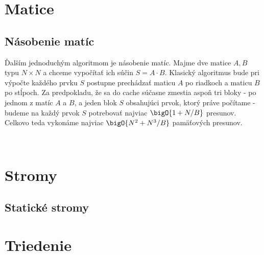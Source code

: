 \section{Matice}

\subsection{Násobenie matíc}

Ďalším jednoduchým \obliv algoritmom je násobenie matíc. Majme dve matice $A, B$ typu $N \times N$ a chceme vypočítať ich súčin $S = A \cdot B$. Klasický algoritmus bude pri výpočte každého prvku $S$ postupne prechádzať maticu $A$ po riadkoch a maticu $B$ po stĺpoch. Za predpokladu, že sa do cache súčasne zmestia aspoň tri bloky - po jednom z matíc $A$ a $B$, a jeden blok $S$ obsahujúci prvok, ktorý práve počítame - budeme na každý prvok $S$ potrebovať najviac $\bigO{1+N/B}$ presunov. Celkovo teda vykonáme najviac $\bigO{N^2 + N^3/B}$ pamäťových presunov. 

\



\section{Stromy}
\subsection{Statické stromy}




\section{Triedenie}

